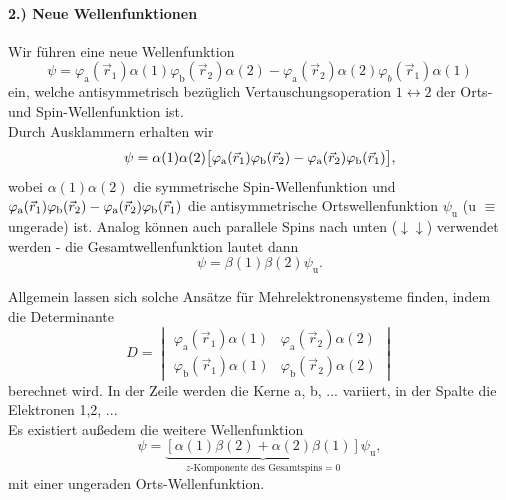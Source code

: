 \paragraph{2.) Neue Wellenfunktionen}
	Wir führen eine neue Wellenfunktion 
	\begin{equation}
		\label{eq:3.28}
		\psi = \varphi_\text{a}(\vec{r}_{1}) \alpha(1) \varphi_\text{b}(\vec{r}_{2})\alpha(2) - \varphi_\text{a}(\vec{r}_{2}) \alpha (2)  \varphi_{b}(\vec{r}_{1}) \alpha(1) 
	\end{equation}
	ein, welche antisymmetrisch bezüglich Vertauschungsoperation $ 1 \leftrightarrow 2$ der Orts- und Spin-Wellenfunktion ist.\\
	Durch Ausklammern erhalten wir
	\begin{equation}
		\label{eq:3.29}
		\psi = \alpha(1)\alpha(2)\big[ \varphi_\text a(\vec r_1)\varphi_\text b(\vec r_2) -\varphi_\text a(\vec r_2)\varphi_\text b(\vec r_1)\big],
	\end{equation}
	wobei $\alpha(1)\alpha(2)$ die symmetrische Spin-Wellenfunktion und $\varphi_\text a(\vec r_1)\varphi_\text b(\vec r_2) -\varphi_\text a(\vec r_2)\varphi_\text b(\vec r_1)$ die antisymmetrische Ortswellenfunktion $ \psi_{\text{u}}$ (u $\equiv$ ungerade) ist. 
	Analog können auch parallele Spins nach unten ($\downarrow\downarrow$) verwendet werden - die Gesamtwellenfunktion lautet dann
	\setcounter{equation}{31}
	\begin{equation}
		\label{eq:3.32}
		\psi = \beta( 1 ) \beta( 2 ) \psi_\text{u}.
	\end{equation}

	Allgemein lassen sich solche Ansätze für Mehrelektronensysteme finden, indem die Determinante
	$$
	D = \begin{vmatrix}
		\varphi_\text{a}( \vec{r}_{1}) \alpha( 1 ) & \varphi_\text{a} ( \vec{r}_{2} ) \alpha( 2 ) \\
		\varphi_\text{b}( \vec{r}_{1}) \alpha( 1 ) & \varphi_\text{b} ( \vec{r}_{2} ) \alpha( 2 ) 
	\end{vmatrix}
	$$ 
	berechnet wird. In der Zeile werden die Kerne a, b, ... variiert, in der Spalte die Elektronen 1,2, ...\\	

	Es existiert außedem die weitere Wellenfunktion 
	$$
	\psi = \underbrace{\left[ \alpha\left( 1 \right) \beta\left( 2 \right)  + \alpha\left( 2 \right) \beta\left( 1 \right)  \right]}_{z\text{-Komponente des Gesamtspins}=0} \psi_\text{u},
	$$ 
	mit einer ungeraden Orts-Wellenfunktion.\\

